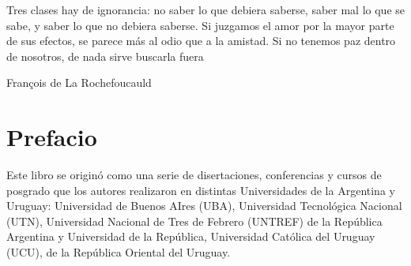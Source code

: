 \documentclass[
11pt, %
spanish,
singlespacing, %
parskip, %
headsepline, %
]{MastersDoctoralThesis} %
\begin{document}
{\larger

\hspace{20mm}Tres clases hay de ignorancia: no saber lo que debiera saberse, saber mal lo que se sabe, y saber lo que no debiera saberse. Si juzgamos el amor por la mayor parte de sus efectos, se parece más al odio que a la amistad. Si no tenemos paz dentro de nosotros, de nada sirve buscarla fuera

\vspace{10mm}
\hspace{7.6cm} François de La Rochefoucauld






}

\chapter*{Prefacio}


{\larger
\hspace{20mm} Este libro se originó como una serie de disertaciones, 
conferencias y cursos de posgrado que los autores realizaron en distintas Universidades de la Argentina y Uruguay: Universidad de Buenos AIres (UBA), Universidad Tecnológica Nacional (UTN), Universidad Nacional de Tres de Febrero (UNTREF) de la República Argentina y Universidad de la República, Universidad Católica del Uruguay (UCU), de la República Oriental del Uruguay.    
}

\chapter*{ }
\end{document}
